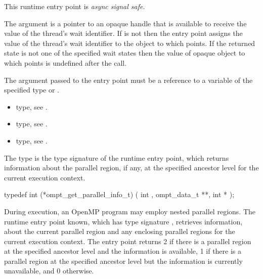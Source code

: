 This runtime entry point is \emph{async signal safe}.

\argdesc
The  argument is a pointer to an opaque handle that is
available to receive the value of the thread's wait identifier. If
 is not  then the entry point assigns the 
value of the thread's wait identifier to the object to which 
 points. If the returned state is not one of the specified
wait states then the value of opaque object to which  points
is undefined after the call.

\constraints
The argument passed to the entry point must be a reference
to a variable of the specified type or .

\crossreferences
\begin{itemize}
\item {} type, see .

\item {} type, see .

\item {} type, see .
\end{itemize}



\label{sec:ompt_get_parallel_info_t}
\label{sec:ompt_get_parallel_info}

\summary
The  type is the type signature of the 
 runtime entry point, which returns information 
about the parallel region, if any, at the specified ancestor level for 
the current execution context.

\format
\begin{ccppspecific}
\begin{omptInquiry}
typedef int (*ompt_get_parallel_info_t) (
  int ,
  ompt_data_t **,
  int *
);
\end{omptInquiry}
\end{ccppspecific}

\descr
During execution, an OpenMP program may employ nested parallel regions.
The  runtime entry point known, which has
type signature , retrieves information,
about the current parallel region and any enclosing parallel regions 
for the current execution context. The entry point returns 2 if there 
is a parallel region at the specified ancestor level and the information 
is available, 1 if there is a parallel region at the specified ancestor 
level but the information is currently unavailable, and 0 otherwise.


